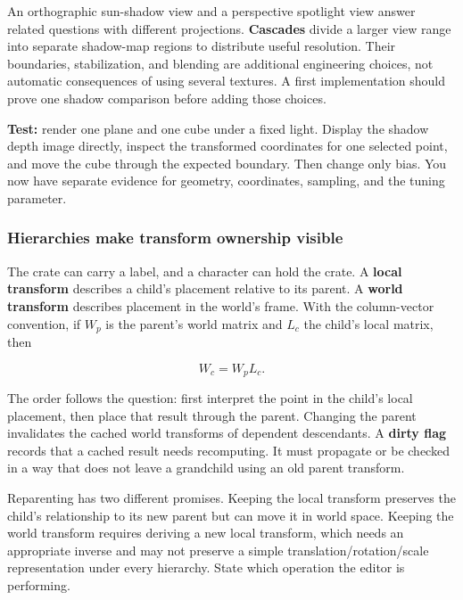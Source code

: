 An orthographic sun-shadow view and a perspective spotlight view answer related questions with different projections. \textbf{Cascades} divide a larger view range into separate shadow-map regions to distribute useful resolution. Their boundaries, stabilization, and blending are additional engineering choices, not automatic consequences of using several textures. A first implementation should prove one shadow comparison before adding those choices.

\textbf{Test:} render one plane and one cube under a fixed light. Display the shadow depth image directly, inspect the transformed coordinates for one selected point, and move the cube through the expected boundary. Then change only bias. You now have separate evidence for geometry, coordinates, sampling, and the tuning parameter.

\subsubsection{Hierarchies make transform ownership visible}\label{06-engine-ii-ch026-hierarchies-make-transform-ownership-visible}

\hypertarget{06-engine-ii-ch026-hierarchies-make-transform-ownership-visible}{}

The crate can carry a label, and a character can hold the crate. A \textbf{local transform} describes a child's placement relative to its parent. A \textbf{world transform} describes placement in the world's frame. With the column-vector convention, if \(W_p\) is the parent's world matrix and \(L_c\) the child's local matrix, then

\[
W_c=W_pL_c.
\]

The order follows the question: first interpret the point in the child's local placement, then place that result through the parent. Changing the parent invalidates the cached world transforms of dependent descendants. A \textbf{dirty flag} records that a cached result needs recomputing. It must propagate or be checked in a way that does not leave a grandchild using an old parent transform.

Reparenting has two different promises. Keeping the local transform preserves the child's relationship to its new parent but can move it in world space. Keeping the world transform requires deriving a new local transform, which needs an appropriate inverse and may not preserve a simple translation/rotation/scale representation under every hierarchy. State which operation the editor is performing.

